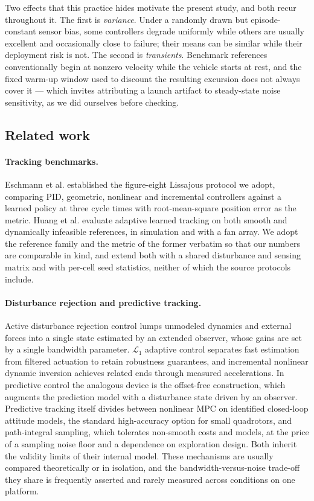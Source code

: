 Two effects that this practice hides motivate the present study, and both recur
throughout it. The first is \emph{variance}. Under a randomly drawn but
episode-constant sensor bias, some controllers degrade uniformly while others are
usually excellent and occasionally close to failure; their means can be similar while
their deployment risk is not. The second is \emph{transients}. Benchmark references
conventionally begin at nonzero velocity while the vehicle starts at rest, and the fixed
warm-up window used to discount the resulting excursion does not always cover it ---
which invites attributing a launch artifact to steady-state noise sensitivity, as we
did ourselves before checking.

\subsection{Related work}

\paragraph{Tracking benchmarks.}
Eschmann et al.\cite{eschmann2024learning} established the figure-eight Lissajous
protocol we adopt, comparing PID, geometric, nonlinear and incremental controllers
against a learned policy at three cycle times with root-mean-square position error as
the metric. Huang et al.\cite{huang2023datt} evaluate adaptive learned tracking on both
smooth and dynamically infeasible references, in simulation and with a fan array. We
adopt the reference family and the metric of the former verbatim so that our numbers are
comparable in kind, and extend both with a shared disturbance and sensing matrix and
with per-cell seed statistics, neither of which the source protocols include.

\paragraph{Disturbance rejection and predictive tracking.}
Active disturbance rejection control\cite{han2009adrc} lumps unmodeled dynamics and
external forces into a single state estimated by an extended observer, whose gains are
set by a single bandwidth parameter\cite{gao2003scaling}. $\mathcal{L}_1$ adaptive
control\cite{hovakimyan2010l1} separates fast estimation from filtered actuation to
retain robustness guarantees, and incremental nonlinear dynamic
inversion\cite{smeur2016indi} achieves related ends through measured accelerations. In
predictive control the analogous device is the offset-free
construction\cite{maeder2009offsetfree}, which augments the prediction model with a
disturbance state driven by an observer. Predictive tracking itself divides between
nonlinear MPC on identified closed-loop attitude models, the standard high-accuracy
option for small quadrotors, and path-integral sampling\cite{williams2018mppi}, which
tolerates non-smooth costs and models, at the price of a sampling noise floor and a
dependence on exploration design. Both inherit the validity limits of their internal
model. These mechanisms are usually compared theoretically or in isolation, and the
bandwidth-versus-noise trade-off they share is frequently asserted and rarely measured
across conditions on one platform.

